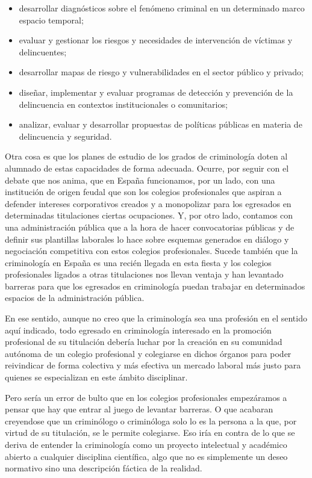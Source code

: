 \documentclass[
  spanish,
  letterpaper,
  DIV=11,
  numbers=noendperiod]{scrreprt}
\begin{document}
\begin{tcolorbox}
\begin{itemize}
\item
  desarrollar diagnósticos sobre el fenómeno criminal en un determinado
  marco espacio temporal;
\item
  evaluar y gestionar los riesgos y necesidades de intervención de
  víctimas y delincuentes;
\item
  desarrollar mapas de riesgo y vulnerabilidades en el sector público y
  privado;
\item
  diseñar, implementar y evaluar programas de detección y prevención de
  la delincuencia en contextos institucionales o comunitarios;
\item
  analizar, evaluar y desarrollar propuestas de políticas públicas en
  materia de delincuencia y seguridad.
\end{itemize}

Otra cosa es que los planes de estudio de los grados de criminología
doten al alumnado de estas capacidades de forma adecuada. Ocurre, por
seguir con el debate que nos anima, que en España funcionamos, por un
lado, con una institución de origen feudal que son los colegios
profesionales que aspiran a defender intereses corporativos creados y a
monopolizar para los egresados en determinadas titulaciones ciertas
ocupaciones. Y, por otro lado, contamos con una administración pública
que a la hora de hacer convocatorias públicas y de definir sus
plantillas laborales lo hace sobre esquemas generados en diálogo y
negociación competitiva con estos colegios profesionales. Sucede también
que la criminología en España es una recién llegada en esta fiesta y los
colegios profesionales ligados a otras titulaciones nos llevan ventaja y
han levantado barreras para que los egresados en criminología puedan
trabajar en determinados espacios de la administración pública.

En ese sentido, aunque no creo que la criminología sea una profesión en
el sentido aquí indicado, todo egresado en criminología interesado en la
promoción profesional de su titulación debería luchar por la creación en
su comunidad autónoma de un colegio profesional y colegiarse en dichos
órganos para poder reivindicar de forma colectiva y más efectiva un
mercado laboral más justo para quienes se especializan en este ámbito
disciplinar.

Pero sería un error de bulto que en los colegios profesionales
empezáramos a pensar que hay que entrar al juego de levantar barreras. O
que acabaran creyendose que un criminólogo o criminóloga solo lo es la
persona a la que, por virtud de su titulación, se le permite colegiarse.
Eso iría en contra de lo que se deriva de entender la criminología como
un proyecto intelectual y académico abierto a cualquier disciplina
científica, algo que no es simplemente un deseo normativo sino una
descripción fáctica de la realidad.

\end{tcolorbox}
\end{document}

